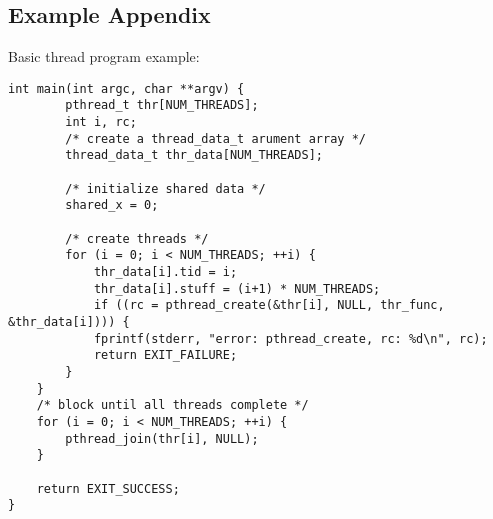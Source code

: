 \documentclass[draftclsnofoot,onecolumn,10pt]{IEEEtran}
\begin{document}
\nocite{linux}
\nocite{bsd}
%
%
%
\newpage
\begin{appendices}

	\section{Example Appendix}
	\label{appendix:program}
	Basic thread program example:
	\begin{lstlisting}[frame=single,caption={Example Caption}]
	int main(int argc, char **argv) {
		pthread_t thr[NUM_THREADS];
		int i, rc;
		/* create a thread_data_t arument array */
		thread_data_t thr_data[NUM_THREADS];

		/* initialize shared data */
		shared_x = 0;

		/* create threads */
		for (i = 0; i < NUM_THREADS; ++i) {
			thr_data[i].tid = i;
			thr_data[i].stuff = (i+1) * NUM_THREADS;
			if ((rc = pthread_create(&thr[i], NULL, thr_func, &thr_data[i]))) {
			fprintf(stderr, "error: pthread_create, rc: %d\n", rc);
			return EXIT_FAILURE;
		}
	}
	/* block until all threads complete */
	for (i = 0; i < NUM_THREADS; ++i) {
		pthread_join(thr[i], NULL);
	}

	return EXIT_SUCCESS;
}
\end{lstlisting}

\end{appendices}

{}

\end{document}
